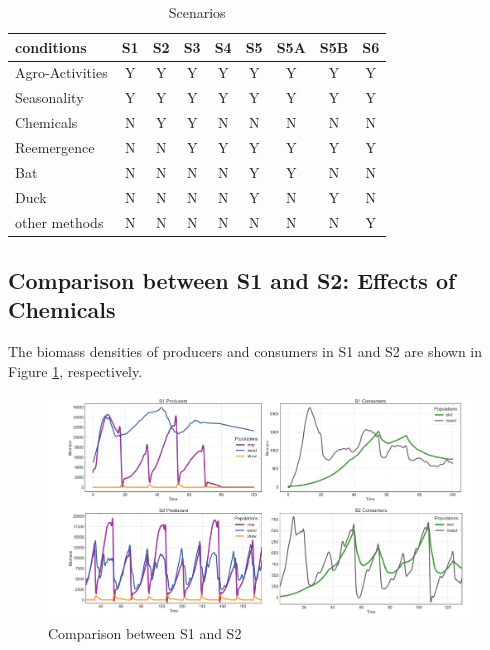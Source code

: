 \documentclass{HZNUMCM}
\begin{document}
        \begin{table}[H]
          \centering
          \caption{Scenarios}
          \begin{tabular}{lcccccccc}
            \toprule
            \rowcolor{customcolor!40} %
            conditions & S1 & S2 & S3 & S4 & S5 & S5A & S5B & S6 \\
            \midrule
            Agro-Activities & Y & Y & Y & Y & Y & Y & Y & Y \\
            Seasonality & Y & Y & Y & Y & Y & Y & Y & Y \\
            Chemicals & N & Y & Y & N & N & N & N & N \\
            Reemergence & N & N & Y & Y & Y & Y & Y & Y \\
            Bat & N & N & N & N & Y & Y & N & N \\
            Duck & N & N & N & N & Y & N & Y & N \\
            other methods & N & N & N & N & N & N & N & Y \\

            \bottomrule
          \end{tabular}
          \label{tab:Scenarios}
        \end{table}
      \subsection{Comparison between S1 and S2: Effects of Chemicals}

      The biomass densities of producers and consumers in S1 and S2 are shown in Figure \ref{fig:S1S2}, respectively.

      \begin{figure}
      \centering
      \includegraphics[width=\linewidth]{images/S1S2.png}
      \caption{Comparison between S1 and S2}
      \label{fig:S1S2}
      \end{figure}
      
\end{document}
